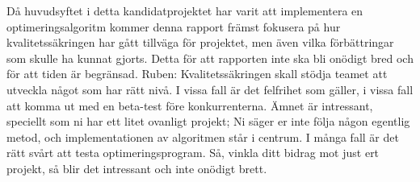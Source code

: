 Då huvudsyftet i detta kandidatprojektet har varit att implementera en optimeringsalgoritm kommer denna rapport främst fokusera på hur kvalitetssäkringen har gått tillväga för projektet, men även vilka förbättringar som skulle ha kunnat gjorts. Detta för att rapporten inte ska bli onödigt bred och för att tiden är begränsad.
\newline
\newline
Ruben: Kvalitetssäkringen skall stödja teamet att utveckla något som har rätt nivå. I vissa fall är det
felfrihet som gäller, i vissa fall att komma ut med en beta-test före konkurrenterna. Ämnet är intressant, 
speciellt som ni har ett litet ovanligt projekt; Ni säger er inte följa någon egentlig metod, och 
implementationen av algoritmen står i centrum. I många fall är det rätt svårt att testa optimeringsprogram. Så, vinkla ditt bidrag mot just ert projekt, så blir det intressant och inte onödigt 
brett.
